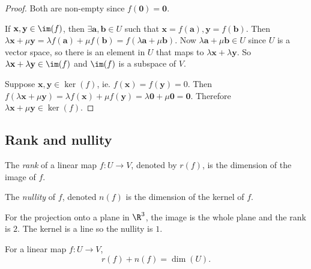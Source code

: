 \documentclass[a4paper]{article}
\begin{document}
\begin{proof}
  Both are non-empty since $f(\mathbf{0}) = \mathbf{0}$.

  If $\mathbf{x, y}\in \im (f)$, then $\exists \mathbf{a, b}\in U$ such that $\mathbf{x} = f(\mathbf{a}), \mathbf{y} = f(\mathbf{b})$.  Then $\lambda \mathbf{x} + \mu\mathbf {y} = \lambda f(\mathbf{a}) + \mu f(\mathbf{b}) = f(\lambda\mathbf{a} + \mu\mathbf{b})$. Now $\lambda\mathbf{a} + \mu\mathbf{b}\in U$ since $U$ is a vector space, so there is an element in $U$ that maps to $\lambda\mathbf{x}+ \lambda\mathbf{y}$. So $\lambda\mathbf{x}+ \lambda\mathbf{y}\in \im (f)$ and $\im (f)$ is a subspace of $V$.

  Suppose $\mathbf{x, y}\in \ker(f)$, ie. $f(\mathbf{x}) = f(\mathbf {y}) = 0$. Then $f(\lambda\mathbf{x} + \mu\mathbf{y}) = \lambda f(\mathbf{x}) + \mu f(\mathbf{y}) = \lambda \mathbf{0} + \mu\mathbf{0} = \mathbf{0}$. Therefore $\lambda\mathbf{x}+ \mu\mathbf{y} \in \ker (f)$.
\end{proof}

\subsection{Rank and nullity}
\begin{defi}
  The \emph{rank} of a linear map $f: U\to V$, denoted by $r(f)$, is the dimension of the image of $f$.
\end{defi}

\begin{defi}
  The \emph{nullity} of $f$, denoted $n(f)$ is the dimension of the kernel of $f$.
\end{defi}

\begin{eg}
  For the projection onto a plane in $\R^3$, the image is the whole plane and the rank is $2$. The kernel is a line so the nullity is $1$.
\end{eg}

\begin{thm}
  For a linear map $f: U \to V$,
  \[
    r(f) + n(f) = \dim (U).
  \]
\end{thm}
\end{document}
